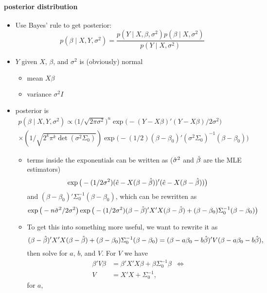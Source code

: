 \paragraph{posterior distribution}
\begin{itemize}
\item Use Bayes' rule to get posterior:
  \[ p(\beta \mid X, Y, \sigma^{2}) = \frac{p(Y \mid X, \beta, \sigma^{2}) p(\beta \mid X,
    \sigma^{2})}{p(Y \mid X, \sigma^{2})}\]
\item $Y$ given $X$, $\beta$, and $\sigma^{2}$ is (obviously) normal
\begin{itemize}
\item mean $X\beta$
\item variance $\sigma^2 I$
\end{itemize}
\item posterior is
  \begin{multline}
    p(\beta \mid X, Y, \sigma^2) \propto \big(1/\sqrt{2 \pi \sigma^2}\big)^n
    \exp\big(-(Y - X\beta)'(Y - X\beta)/2\sigma^2\big) \\
    \times (1/\sqrt{2^k \pi^k \det(\sigma^2 \Sigma_0)})
    \exp\big(- (1/2) (\beta - \beta_0)'(\sigma^2 \Sigma_0)^{-1} (\beta - \beta_0)\big)
  \end{multline}
\begin{itemize}
\item terms inside the exponentials can be written as ($\hat{\sigma}^2$ and
  $\hat{\beta}$ are the MLE estimators)
  \[\exp\big(- (1/2 \sigma^2) (\hat{e} - X(\beta - \hat{\beta}))' (\hat{e} - X(\beta - \hat{\beta}))\big)\]
  and $(\beta - \beta_0)'\Sigma_0^{-1}(\beta - \beta_0)$,
  which can be rewritten as
  \begin{equation*}
    \exp\big(- n \hat{\sigma}^2/2 \sigma^2\big)
    \exp\big(- (1/2\sigma^2) (\beta - \hat{\beta})'X'X(\beta - \hat{\beta}) + (\beta - \beta_0)\Sigma_0^{-1}(\beta - \beta_0)\big)
  \end{equation*}
\item To get this into something more useful, we want to rewrite it as
  \[(\beta - \hat{\beta})'X'X(\beta - \hat{\beta}) + (\beta - \beta_0)\Sigma_0^{-1}(\beta - \beta_0) = (\beta - a \beta_0 - b \hat{\beta})'V(\beta - a \beta_0 - b \hat{\beta}),\]
  then solve for $a$, $b$, and $V$.  For $V$ we have
  \begin{align*}
    \beta'V\beta &= \beta'X'X\beta + \beta \Sigma_0^{-1} \beta & \iff \\
    V    &= X'X + \Sigma_0^{-1},
  \end{align*}
  for $a$,
  \begin{align*}

\end{align*}
\end{itemize}
\end{itemize}
